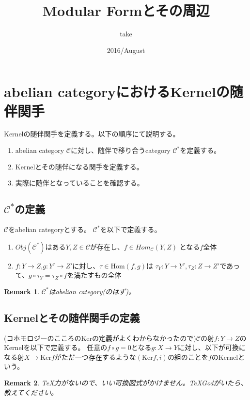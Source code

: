 \documentclass{ujarticle}
\title{Modular Formとその周辺}
\author{take}
\date{2016/August}
\newtheorem*{rem}{Remark}
\begin{document}
\section{abelian categoryにおけるKernelの随伴関手}
\label{sec:abelian categoryで、Kernelの随伴関手}
Kernelの随伴関手を定義する。以下の順序にて説明する。
\begin{enumerate}
  \item abelian category $ \mathcal{C}$に対し、随伴で移り合うcategory $\mathcal{C}^*$を定義する。
  \item Kernelとその随伴になる関手を定義する。
  \item 実際に随伴となっていることを確認する。
\end{enumerate}

\subsection{$\mathcal{C}^*$の定義}


$\mathcal{C}$をabelian categoryとする。
$ \mathcal{C}^*$を以下で定義する。
\begin{enumerate}
  \item $Obj(\mathcal{C}^*)$はある$Y,Z \in \mathcal{C}$が存在し、$f \in Hom_{\mathcal{C}}(Y,Z)$
  となる$f$全体
  \item $f:Y \to Z$,$g:Y' \to Z'$に対し、$\tau \in \mathrm{Hom}(f,g)$は
  $\tau_Y:Y \to Y',\tau_Z:Z \to Z'$であって、$g \circ \tau_Y = \tau_Z \circ f$を満たすもの全体
\end{enumerate}
\begin{rem}
 $ \mathcal{C}^* $はabelian category(のはず)。
\end{rem}

\subsection{Kernelとその随伴関手の定義}
\label{sub:Kernelとその随伴関手の定義}

(コホモロジーのこころのKerの定義がよくわからなかったので)$ \mathcal{C} $の射$f:Y \to Z$のKernelを以下で定義する。
任意の$f \circ g = 0$となる$g:X \to Y$に対し、以下が可換になる射$X \to \mathrm{Ker}f$がただ一つ存在するような$(\mathrm{Ker}f,i)$の組のことを$f$のKernelという。

\begin{rem}
 TeX力がないので、いい可換図式がかけません。TeXGodがいたら、教えてください。
\end{rem}
\end{document}
